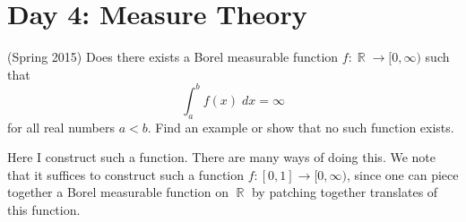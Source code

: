 \documentclass{exam}
\DeclareMathOperator{\RR}{\mathbb{R}}
\theoremstyle{problemstyle}
\newcommand{\norm}[1]{\left\lVert#1\right\rVert} %
\newcommand{\1}[1]{\textbf{1}_{\left[#1\right]}} %
\def\R{\mathbb{R}} %
\begin{document}
\begin{questions}
\begin{solution}
\begin{comment}
  Let $\epsilon>0$. Since $E$ is measurable and $|E|<\infty$, $\chi_{E}$ is integrable. Since $C_{c}(\R)$ is dense in $L^{1}(\R)$, there exists $g\in C_{c}(\R)$ such that $\norm{g-\chi_{E}}_{L^{1}(\R)}<\epsilon/3$. Since $g$ is continuous and compactly supported, it is unformly continuous. Therefore (again using the fact that $|E|<\infty$) we may choose $\delta>0$ such
  \begin{equation}
    |g(x)-g(y)|< \frac{\epsilon}{3|E|}\label{eq:uniform-continuity}
  \end{equation}
  whenever $|x-y|<\delta$.
Let $r,s\in \R$ such that $|s-r|<\delta$. Writing $f(r)= \int_{\R}\chi_{E}(x)\chi_{E}(x-r)dx$, we have
\begin{align*}
  f(r)-f(s) & = \int_{\R}\chi_{E}(x)\left[\chi_{E}(x-r)-\chi_{E}(x-s)\right]dx\\
            & = \int_{\R}\chi_{E}(x)\left[\chi_{E}(x-r)-g(x-r)+g(x-r)-g(x-s)+g(x-s)-\chi_{E}(x-s)\right]dx.
\end{align*}
Therefore by the triangle inequality,
\begin{align*}
  |f(r)-f(s)| &\leq \int_{\R}\chi_{E}(x)|\chi_{E}(x-r)-g(x-r)|dx + \int_{\R}\chi_{E}(x)|g(x-r)-g(x-s)|dx \\ 
  &\quad +\int_{\R}\chi_{E}|g(x-s)-\chi_{E}(x-s)|dx.\\
              &\leq \int_{\R}|\chi_{E}(x-r)-g(x-r)|dx + \int_{E}|g(x-r)-g(x-s)|dx \\\quad &+\int_{\R}|g(x-s)-\chi_{E}(x-s)|dx.
\end{align*}
By translation invariance (i.e. do a u-substitution), the first and third integrals both equal  $\int_{\R}|\chi_{E}(x)-g(x)|dx < \epsilon/3$. By \eqref{eq:uniform-continuity}, the second integral is less than $\epsilon/3$. Therefore $|f(r)-f(s)|<\epsilon$. We have shown that $\delta$ responds to the $\epsilon$-challenge in the definition of continuity. Therefore $f$ is continuous.
\end{comment}
\end{solution}

\newpage
\section{Day 4: Measure Theory}


\question (Spring 2015) Does there exists a Borel measurable function $f: \RR \to [0,\infty)$ such that
%
\[ \int_a^b f(x)\; dx = \infty \]
%
for all real numbers $a < b$. Find an example or show that no such function exists.
\begin{solution}
    Here I construct such a function. There are many ways of doing this. We note that it suffices to construct such a function $f: [0,1] \to [0,\infty)$, since one can piece together a Borel measurable function on $\RR$ by patching together translates of this function.
    

\end{solution}
\end{questions}
\end{document}
